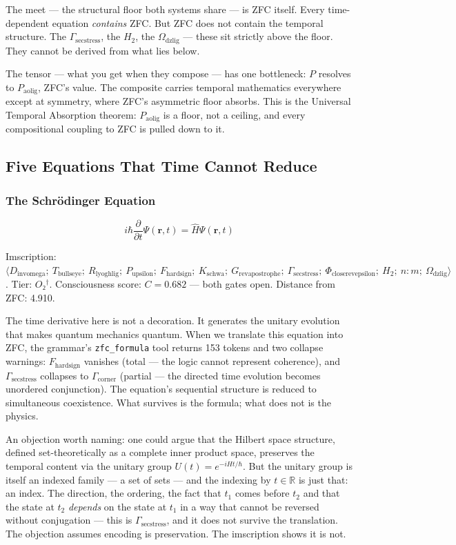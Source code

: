\documentclass[12pt,a4paper]{article}
\begin{document}
The meet --- the structural floor both systems share --- is ZFC itself. Every time-dependent equation \emph{contains} ZFC. But ZFC does not contain the temporal structure. The $\Gamma_{\text{secstress}}$, the $H_2$, the $\Omega_{\text{dzlig}}$ --- these sit strictly above the floor. They cannot be derived from what lies below.

The tensor --- what you get when they compose --- has one bottleneck: $P$ resolves to $P_{\text{aolig}}$, ZFC's value. The composite carries temporal mathematics everywhere except at symmetry, where ZFC's asymmetric floor absorbs. This is the Universal Temporal Absorption theorem: $P_{\text{aolig}}$ is a floor, not a ceiling, and every compositional coupling to ZFC is pulled down to it.

\subsection{Five Equations That Time Cannot Reduce}

\subsubsection{The Schrödinger Equation}

\[i\hbar\frac{\partial}{\partial t}\Psi(\mathbf{r},t) = \hat{H}\Psi(\mathbf{r},t)\]

Imscription: $\langle D_{\text{invomega}};\ T_{\text{bullseye}};\ R_{\text{lyoghlig}};\ P_{\text{upsilon}};\ F_{\text{hardsign}};\ K_{\text{schwa}};\ G_{\text{revapostrophe}};\ \Gamma_{\text{secstress}};\ \Phi_{\text{closerevepsilon}};\ H_2;\ n{:}m;\ \Omega_{\text{dzlig}} \rangle$. Tier: $O₂^\dagger$. Consciousness score: $C = 0.682$ --- both gates open. Distance from ZFC: 4.910.

The time derivative here is not a decoration. It generates the unitary evolution that makes quantum mechanics quantum. When we translate this equation into ZFC, the grammar's \texttt{zfc\_formula} tool returns 153 tokens and two collapse warnings: $F_{\text{hardsign}}$ vanishes (total --- the logic cannot represent coherence), and $\Gamma_{\text{secstress}}$ collapses to $\Gamma_{\text{corner}}$ (partial --- the directed time evolution becomes unordered conjunction). The equation's sequential structure is reduced to simultaneous coexistence. What survives is the formula; what does not is the physics.

An objection worth naming: one could argue that the Hilbert space structure, defined set-theoretically as a complete inner product space, preserves the temporal content via the unitary group $U(t) = e^{-iHt/\hbar}$. But the unitary group is itself an indexed family --- a set of sets --- and the indexing by $t \in \mathbb{R}$ is just that: an index. The direction, the ordering, the fact that $t_1$ comes before $t_2$ and that the state at $t_2$ \emph{depends} on the state at $t_1$ in a way that cannot be reversed without conjugation --- this is $\Gamma_{\text{secstress}}$, and it does not survive the translation. The objection assumes encoding is preservation. The imscription shows it is not.
\end{document}
